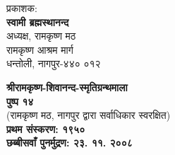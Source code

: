 \thispagestyle{empty}

\begin{flushleft}
\end{flushleft}

\vfill

\begin{flushleft}
 प्रकाशक:\\\textbf{स्वामी ब्रह्मस्थानन्द}\\
 अध्यक्ष, रामकृष्ण मठ\\
 रामकृष्ण आश्रम मार्ग\\
 धन्तोली, नागपुर-४४० ०१२\\
\end{flushleft}

\vfill

\begin{flushleft}
 \textbf{श्रीरामकृष्ण-शिवानन्द-स्मृतिग्रन्थमाला}\\\textbf{पुष्प १४}\\
 (रामकृष्ण मठ, नागपुर द्वारा सर्वाधिकार स्वरक्षित)\\\textbf{प्रथम संस्करण: १९५०}\\\textbf{छब्बीसवाँ पुनर्मुद्रण: २३. ११. २००८}
\end{flushleft}

